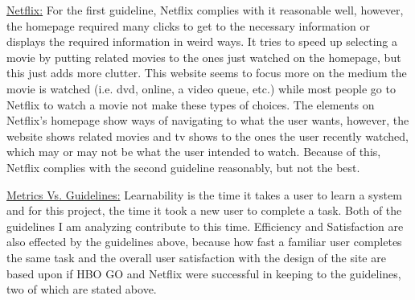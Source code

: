 \documentclass[11pt]{article}
\begin{document}
\underline{Netflix:}
For the first guideline, Netflix complies with it reasonable well, however, the homepage required many clicks to get to the necessary information or displays the required information in weird ways. It tries to speed up selecting a movie by putting related movies to the ones just watched on the homepage, but this just adds more clutter. This website seems to focus more on the medium the movie is watched (i.e. dvd, online, a video queue, etc.) while most people go to Netflix to watch a movie not make these types of choices.
The elements on Netflix's homepage show ways of navigating to what the user wants, however, the website shows related movies and tv shows to the ones the user recently watched, which may or may not be what the user intended to watch. Because of this, Netflix complies with the second guideline reasonably, but not the best.

\underline{Metrics Vs. Guidelines:}
Learnability is the time it takes a user to learn a system and for this project, the time it took a new user to complete a task. Both of the guidelines I am analyzing contribute to this time. Efficiency and Satisfaction are also effected by the guidelines above, because how fast a familiar user completes the same task and the overall user satisfaction with the design of the site are based upon if HBO GO and Netflix were successful in keeping to the guidelines, two of which are stated above.
\end{document}
